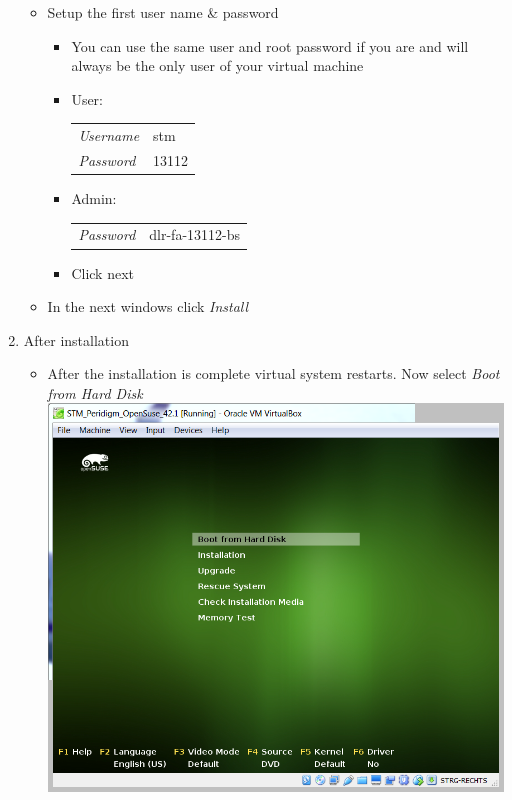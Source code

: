 \begin{enumerate}[noitemsep]
\begin{itemize}
   \item Setup the first user name \& password
   \begin{itemize}
    \item You can use the same user and root password if you are and will always be the only user of your virtual machine
    \item User: 
      \begin{tabular}[t]{ll}
      \textit{Username}	& stm	\\
      \textit{Password}	& 13112	\\
      \end{tabular}
    \item Admin:
      \begin{tabular}[t]{ll}
      \textit{Password}	& dlr-fa-13112-bs	\\
      \end{tabular}
    \item Click next
   \end{itemize}
   \item In the next windows click \textit{Install}
 \end{itemize}
 \item After installation
 \begin{itemize}
   \item After the installation is complete virtual system restarts. Now select \textit{Boot from Hard Disk}\\
   \includegraphics[scale=0.25]{Figures/VirtualBox_VirtualMachine_OperatingSystem_Boot_HardDisk}

\end{itemize}
\end{enumerate}
